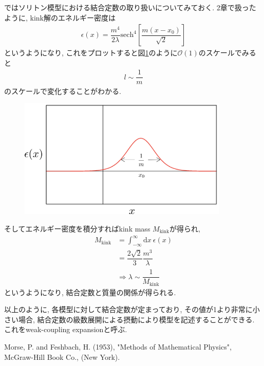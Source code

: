 \documentclass[dvipdfmx,11pt,a4paper,oneside,openany]{jsbook}
\begin{document}
ではソリトン模型における結合定数の取り扱いについてみておく. 2章で扱ったように, kink解のエネルギー密度は
\begin{align*}
    \epsilon(x)=\dfrac{m^4}{2\lambda}\mathrm{sech}^4\left[\dfrac{m(x-x_0)}{\sqrt{2}}\right]
\end{align*}
というようになり, これをプロットすると図\ref{fig2}のように$\mathcal{O}(1)$のスケールでみると
\begin{align*}
    l\sim \dfrac{1}{m}
\end{align*}
のスケールで変化することがわかる.
\begin{figure}[H]
    \centering
    \includegraphics[width=10cm]{figure/fig2.png}
    \caption{}
    \label{fig2}
\end{figure}
そしてエネルギー密度を積分すればkink mass $M_\text{kink}$が得られ,
\begin{align*}
    M_{\text{kink}} & =\int_{-\infty}^{\infty}\mathrm{d}x~\epsilon(x)     \\
                    & =\dfrac{2\sqrt{2}}{3}\dfrac{m^3}{\lambda}           \\
                    & \Rightarrow \lambda \sim \dfrac{1}{M_{\text{kink}}}
\end{align*}
というようになり, 結合定数と質量の関係が得られる.

以上のように, 各模型に対して結合定数が定まっており, その値が1より非常に小さい場合, 結合定数の級数展開による摂動により模型を記述することができる. これをweak-coupling expansionと呼ぶ.


\begin{thebibliography}{99}
    \bibitem[morse] Morse, P. and Feshbach, H. (1953), "Methods of Mathematical Physics", McGraw-Hill Book Co., (New York).
\end{thebibliography}
\end{document}
